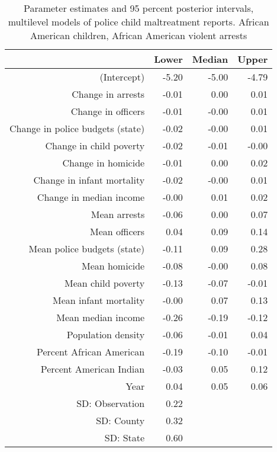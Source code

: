 \begin{table}[ht]
\centering
\begin{tabular}{rrrr}
  \hline
 & Lower & Median & Upper \\ 
  \hline
(Intercept) & -5.20 & -5.00 & -4.79 \\ 
  Change in arrests & -0.01 & 0.00 & 0.01 \\ 
  Change in officers & -0.01 & -0.00 & 0.01 \\ 
  Change in police budgets (state) & -0.02 & -0.00 & 0.01 \\ 
  Change in child poverty & -0.02 & -0.01 & -0.00 \\ 
  Change in homicide & -0.01 & 0.00 & 0.02 \\ 
  Change in infant mortality & -0.02 & -0.00 & 0.01 \\ 
  Change in median income & -0.00 & 0.01 & 0.02 \\ 
  Mean arrests & -0.06 & 0.00 & 0.07 \\ 
  Mean officers & 0.04 & 0.09 & 0.14 \\ 
  Mean police budgets (state) & -0.11 & 0.09 & 0.28 \\ 
  Mean homicide & -0.08 & -0.00 & 0.08 \\ 
  Mean child poverty & -0.13 & -0.07 & -0.01 \\ 
  Mean infant mortality & -0.00 & 0.07 & 0.13 \\ 
  Mean median income & -0.26 & -0.19 & -0.12 \\ 
  Population density & -0.06 & -0.01 & 0.04 \\ 
  Percent African American & -0.19 & -0.10 & -0.01 \\ 
  Percent American Indian & -0.03 & 0.05 & 0.12 \\ 
  Year & 0.04 & 0.05 & 0.06 \\ 
  SD: Observation & 0.22 &  &  \\ 
  SD: County & 0.32 &  &  \\ 
  SD: State & 0.60 &  &  \\ 
   \hline
\end{tabular}
\caption{Parameter estimates and 95 percent posterior intervals, multilevel models of 
             police child maltreatment reports. African American children, African American violent arrests} 
\end{table}
